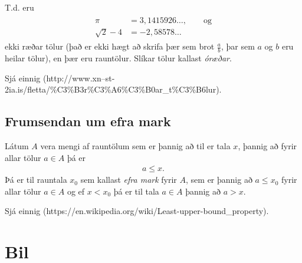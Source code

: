 \documentclass[b5paper,10pt,icelandic]{sphinxmanual}
\begin{document}
T.d. eru
\begin{equation*}
\begin{split}\begin{aligned}
\pi &= 3,1415926\ldots, \qquad \text{og}\\
\sqrt 2 -4  &= -2,58578\ldots\end{aligned}\end{split}
\end{equation*}
ekki ræðar tölur (það er ekki hægt að skrifa þær sem brot
\(\frac ab\), þar sem \(a\) og \(b\) eru heilar tölur), en
þær eru rauntölur. Slíkar tölur kallast \textit{óræðar}.

Sjá einnig  (http://www.xn--st-2ia.is/fletta/\%C3\%B3r\%C3\%A6\%C3\%B0ar\_t\%C3\%B6lur).


\subsection{Frumsendan um efra mark}
\label{\detokenize{kafli01:frumsendanumeframark}}\label{\detokenize{kafli01:index-1}}\label{\detokenize{kafli01:frumsendan-um-efra-mark}}
Látum \(A\) vera mengi af rauntölum sem
er þannig að til er tala \(x\), þannig að fyrir allar tölur
\(a \in A\) þá er
\begin{equation*}
\begin{split}a\leq x.\end{split}
\end{equation*}
Þá er til rauntala \(x_0\) sem kallast \textit{efra mark} fyrir
\(A\), sem er þannig að \(a\leq x_0\) fyrir allar tölur
\(a\in
A\) og ef \(x<x_0\) þá er til tala \(a\in A\) þannig að
\(a>x\).

Sjá einnig  (https://en.wikipedia.org/wiki/Least-upper-bound\_property).


\section{Bil}
\label{\detokenize{kafli01:bil}}\label{\detokenize{kafli01:skilgreining-1-3-1}}
\end{document}
